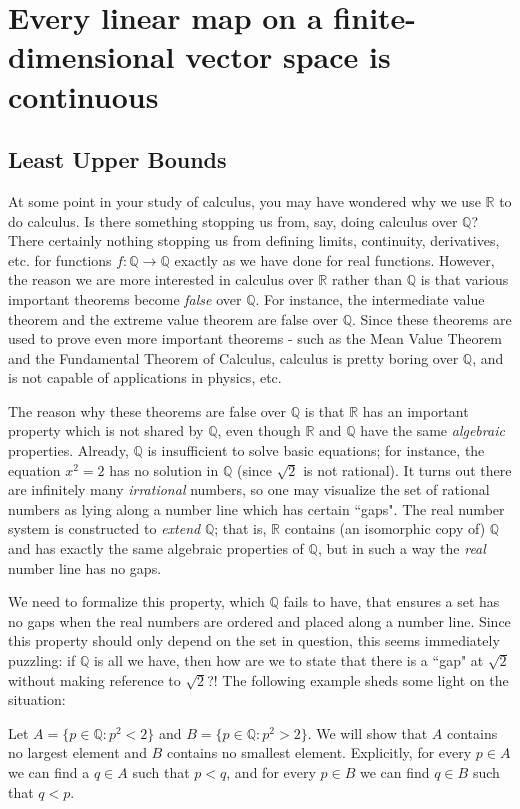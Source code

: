 \documentclass[12pt,letterpaper,reqno]{article}
\numberwithin{equation}{section}
\newcommand{\R}{\ensuremath{\mathbb R}}
\newcommand{\Q}{\ensuremath{\mathbb Q}}
\newcommand{\fixme}[1]{{\color{orange}{[#1]}}}
\begin{document}
{\section{Every linear map on a finite-dimensional vector space is continuous}
\subsection{Least Upper Bounds}
At some point in your study of calculus, you may have wondered why we use $\R$ to do calculus. Is there something stopping us from, say, doing calculus over $\Q$? There certainly nothing stopping us from defining limits, continuity, derivatives, etc. for functions $f:\Q \to \Q$ exactly as we have done for real functions. \fixme{Add example.} However, the reason we are more interested in calculus over $\R$ rather than $\Q$ is that various important theorems become \emph{false} over $\Q$. For instance, the intermediate value theorem and the extreme value theorem are false over $\Q$. \fixme{Add examples.} Since these theorems are used to prove even more important theorems - such as the Mean Value Theorem and the Fundamental Theorem of Calculus, calculus is pretty boring over $\Q$, and is not capable of applications in physics, etc.

The reason why these theorems are false over $\Q$ is that $\R$ has an important property which is not shared by $\Q$, even though $\R$ and $\Q$ have the same \emph{algebraic} properties. Already, $\Q$ is insufficient to solve basic equations; for instance, the equation $x^2=2$ has no solution in $\Q$ (since $\sqrt{2}$ is not rational). It turns out there are infinitely many \emph{irrational} numbers, so one may visualize the set of rational numbers as lying along a number line which has certain ``gaps". The real number system is constructed to \emph{extend} $\Q$; that is, $\R$ contains (an isomorphic copy of) $\Q$ and has exactly the same algebraic properties of $\Q$, but in such a way the \emph{real} number line has no gaps. 

We need to formalize this property, which $\Q$ fails to have, that ensures a set has no gaps when the real numbers are ordered and placed along a number line. Since this property should only depend on the set in question, this seems immediately puzzling: if $\Q$ is all we have, then how are we to state that there is a ``gap" at $\sqrt{2}$ without making reference to $\sqrt{2}$?! The following example sheds some light on the situation:
\begin{example}\label{ex:q_no_lub_property}
Let $A=\{p \in \Q: p^2<2\}$ and $B=\{p \in \Q:p^2>2\}$. We will show that $A$ contains no largest element and $B$ contains no smallest element. Explicitly, for every $p \in A$ we can find a $q \in A$ such that $p<q$, and for every $p\in B$ we can find $q \in B$ such that $q<p$.


\end{example}}
\end{document}
